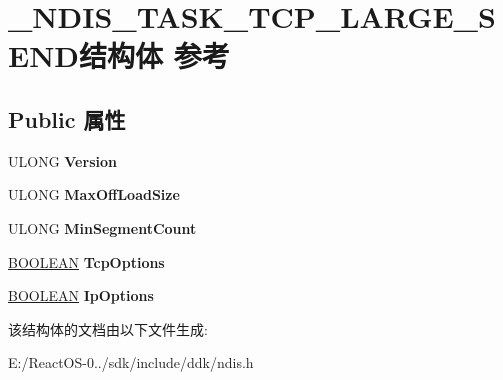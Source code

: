 \hypertarget{struct___n_d_i_s___t_a_s_k___t_c_p___l_a_r_g_e___s_e_n_d}{}\section{\+\_\+\+N\+D\+I\+S\+\_\+\+T\+A\+S\+K\+\_\+\+T\+C\+P\+\_\+\+L\+A\+R\+G\+E\+\_\+\+S\+E\+N\+D结构体 参考}
\label{struct___n_d_i_s___t_a_s_k___t_c_p___l_a_r_g_e___s_e_n_d}
\subsection*{Public 属性}
\begin{DoxyCompactItemize}
\item 
\mbox{\label{struct___n_d_i_s___t_a_s_k___t_c_p___l_a_r_g_e___s_e_n_d_ac0133cce8879947a413e0d4a118d5b3f}} 
U\+L\+O\+NG {\bfseries Version}
\item 
\mbox{\label{struct___n_d_i_s___t_a_s_k___t_c_p___l_a_r_g_e___s_e_n_d_a569bcdf7cd3f32dc3f444b467aae5949}} 
U\+L\+O\+NG {\bfseries Max\+Off\+Load\+Size}
\item 
\mbox{\label{struct___n_d_i_s___t_a_s_k___t_c_p___l_a_r_g_e___s_e_n_d_a5fb17e4fb2836b8b2147a7a19bbda5a1}} 
U\+L\+O\+NG {\bfseries Min\+Segment\+Count}
\item 
\mbox{\label{struct___n_d_i_s___t_a_s_k___t_c_p___l_a_r_g_e___s_e_n_d_afc9d5d17b3c0c1a2169df7b4d61388e6}} 
\hyperlink{_processor_bind_8h_a112e3146cb38b6ee95e64d85842e380a}{B\+O\+O\+L\+E\+AN} {\bfseries Tcp\+Options}
\item 
\mbox{\label{struct___n_d_i_s___t_a_s_k___t_c_p___l_a_r_g_e___s_e_n_d_a48232207d3a0f73272929ec78d477526}} 
\hyperlink{_processor_bind_8h_a112e3146cb38b6ee95e64d85842e380a}{B\+O\+O\+L\+E\+AN} {\bfseries Ip\+Options}
\end{DoxyCompactItemize}


该结构体的文档由以下文件生成\+:\begin{DoxyCompactItemize}
\item 
E\+:/\+React\+O\+S-\/0../sdk/include/ddk/ndis.\+h\end{DoxyCompactItemize}

